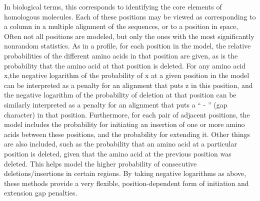 In biological terms, this corresponds to identifying the core elements of homologous molecules. 
Each of these positions may be viewed as corresponding to a column in a multiple alignment of the sequences, or to a position in space, Often not all positions are modeled, but only the ones with the most significantly nonrandom statistics. 
As in a profile, for each position in the model, the relative probabilities of the different amino acids in that position are given, as is the probability that the amino acid at that position is deleted. For any amino acid x,the negative logarithm of the probability of x at a given position in the model can be interpreted as a penalty for an alignment that puts z in this position, and the negative logarithm of the probability of deletion at that position can be similarly interpreted as a penalty for an alignment that puts a “ - ” (gap character) in that position. Furthermore, for each pair of adjacent positions, the model includes the probability for initiating an insertion of one or more amino acids between these positions, and the probability for extending it. 
Other things are also included, such as the probability that an amino acid at a particular position is deleted, given that the amino acid at the previous position was deleted. This helps model the higher probability of consecutive deletions/insertions in certain regions. By taking negative logarithms as above, these methods provide a very flexible, position-dependent form of initiation and extension gap penalties.

